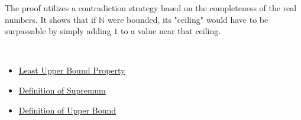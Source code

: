 \begin{remark*}
The proof utilizes a contradiction strategy based on the completeness of the real numbers. It shows that if $\mathbb{N}$ were bounded, its "ceiling" would have to be surpassable by simply adding $1$ to a value near that ceiling.
\end{remark*}

\begin{remark*}[Dependencies]~\\
\begin{itemize}
  \item \hyperref[pred:least-upper-bound-property]{Least Upper Bound Property}
  \item \hyperref[pred:supremum]{Definition of Supremum}
  \item \hyperref[pred:upper-bound]{Definition of Upper Bound}
\end{itemize}
\end{remark*}